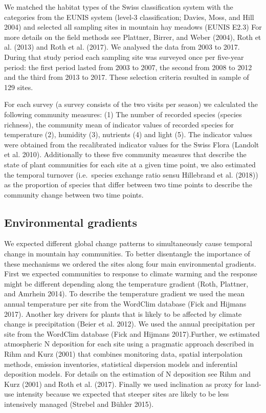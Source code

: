 \documentclass[fleqn,10pt,lineno]{wlpeerj} %
\theoremstyle{definition}
\theoremstyle{definition}
\theoremstyle{definition}
\theoremstyle{remark}
\begin{document}
We matched the habitat types of the Swiss classification system with the
categories from the EUNIS system (level-3 classification; Davies, Moss,
and Hill 2004) and selected all sampling sites in mountain hay meadows
(EUNIS E2.3) For more details on the field methods see Plattner, Birrer,
and Weber (2004), Roth et al. (2013) and Roth et al. (2017). We analysed
the data from 2003 to 2017. During that study period each sampling site
was surveyed once per five-year period: the first period lasted from
2003 to 2007, the second from 2008 to 2012 and the third from 2013 to
2017. These selection criteria resulted in sample of 129 sites.

For each survey (a survey consists of the two visits per season) we
calculated the following community measures: (1) The number of recorded
species (species richness), the community mean of indicator values of
recorded species for temperature (2), humidity (3), nutrients (4) and
light (5). The indicator values were obtained from the recalibrated
indicator values for the Swiss Flora (Landolt et al. 2010). Additionally
to these five community measures that describe the state of plant
communities for each site at a given time point, we also estimated the
temporal turnover (i.e.~species exchange ratio sensu Hillebrand et al.
(2018)) as the proportion of species that differ between two time points
to describe the community change between two time points.

\subsection*{Environmental gradients}\label{environmental-gradients}

We expected different global change patterns to simultaneously cause
temporal change in mountain hay communities. To better disentangle the
importance of these mechanisms we ordered the sites along four main
environmental gradients. First we expected communities to response to
climate warming and the response might be different depending along the
temperature gradient (Roth, Plattner, and Amrhein 2014). To describe the
temperature gradient we used the mean annual temperature per site from
the WordClim database (Fick and Hijmans 2017). Another key drivers for
plants that is likely to be affected by climate change is precipitation
(Beier et al. 2012). We used the annual precipitation per site from the
WordClim database (Fick and Hijmans 2017).Further, we estimated
atmospheric N deposition for each site using a pragmatic approach
described in Rihm and Kurz (2001) that combines monitoring data, spatial
interpolation methods, emission inventories, statistical dispersion
models and inferential deposition models. For details on the estimation
of N deposition see Rihm and Kurz (2001) and Roth et al. (2017). Finally
we used inclination as proxy for land-use intensity because we expected
that steeper sites are likely to be less intensively managed (Strebel
and Bühler 2015).
\end{document}
